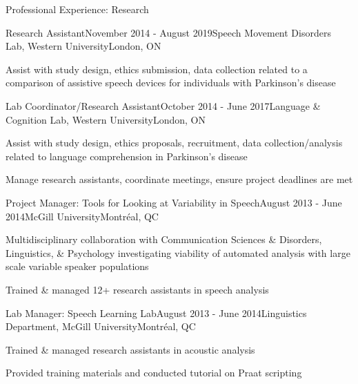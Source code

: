 \documentclass{resume} %
\begin{document}


\begin{rSection}{Professional Experience: Research}

	\begin{rSubsection}{Research Assistant}{November 2014 - August 2019}{Speech Movement Disorders Lab, Western University}{London, ON}
	\item Assist with study design, ethics submission, data collection related to a comparison of assistive speech devices for individuals with Parkinson's disease
	\end{rSubsection}
	
	
	\begin{rSubsection}{Lab Coordinator/Research Assistant}{October 2014 - June 2017}{Language \& Cognition Lab, Western University}{London, ON}
	\item Assist with study design, ethics proposals, recruitment, data collection/analysis related to language comprehension in Parkinson's disease
	\item Manage research assistants, coordinate meetings, ensure project deadlines are met
	\end{rSubsection}
	
	
	\begin{rSubsection}{Project Manager: Tools for Looking at Variability in Speech}{August 2013 - June 2014}{McGill University}{Montr\'eal, QC}
	\item Multidisciplinary collaboration with Communication Sciences \& Disorders, Linguistics, \& Psychology investigating viability of automated analysis with large scale variable speaker populations
	\item Trained \& managed 12+ research assistants in speech analysis
	\end{rSubsection}
	
	
	\begin{rSubsection}{Lab Manager: Speech Learning Lab}{August 2013 - June 2014}{Linguistics Department, McGill University}{Montr\'eal, QC}
	\item Trained \& managed research assistants in acoustic analysis
	\item Provided training materials and conducted tutorial on Praat scripting
	\end{rSubsection}
	

\end{rSection}
\end{document}
